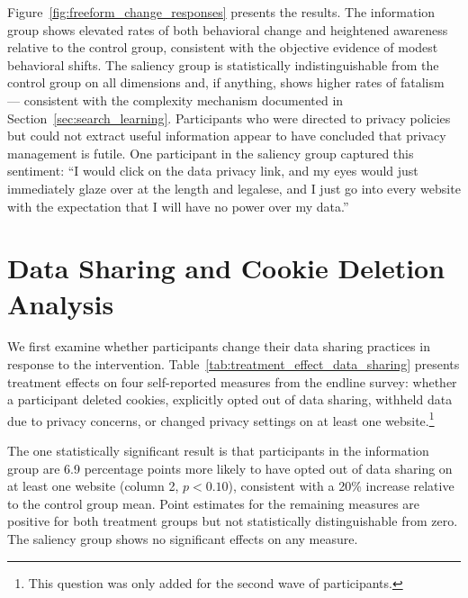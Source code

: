 \documentclass[12pt]{article}
\theoremstyle{definition}
\theoremstyle{remark}
\begin{document}
\begin{appendix}
Figure~\ref{fig:freeform_change_responses} presents the results. The information group shows elevated rates of both behavioral change and heightened awareness relative to the control group, consistent with the objective evidence of modest behavioral shifts. The saliency group is statistically indistinguishable from the control group on all dimensions and, if anything, shows higher rates of fatalism --- consistent with the complexity mechanism documented in Section~\ref{sec:search_learning}. Participants who were directed to privacy policies but could not extract useful information appear to have concluded that privacy management is futile. One participant in the saliency group captured this sentiment: ``I would click on the data privacy link, and my eyes would just immediately glaze over at the length and legalese, and I just go into every website with the expectation that I will have no power over my data.''



\section{Data Sharing and Cookie Deletion Analysis}\label{sec:cookie_deletion_analysis}
 
We first examine whether participants change their data sharing practices in response to the intervention. Table~\ref{tab:treatment_effect_data_sharing} presents treatment effects on four self-reported measures from the endline survey: whether a participant deleted cookies, explicitly opted out of data sharing, withheld data due to privacy concerns, or changed privacy settings on at least one website.\footnote{This question was only added for the second wave of participants.}
 
The one statistically significant result is that participants in the information group are 6.9 percentage points more likely to have opted out of data sharing on at least one website (column 2, $p < 0.10$), consistent with a 20\% increase relative to the control group mean. Point estimates for the remaining measures are positive for both treatment groups but not statistically distinguishable from zero. The saliency group shows no significant effects on any measure.
 
 

\end{appendix}
\end{document}
